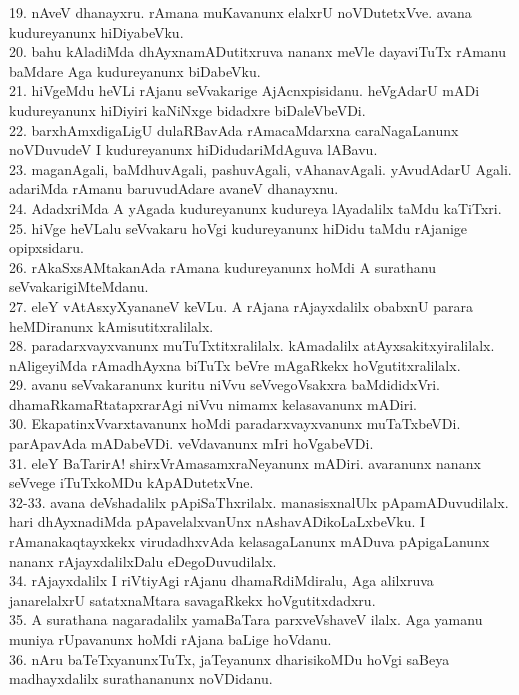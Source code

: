 \documentclass{article}
\begin{document}
19. nAveV dhanayxru. rAmana muKavanunx elalxrU noVDutetxVve. avana kudureyanunx hiDiyabeVku.\\
20. bahu kAladiMda dhAyxnamADutitxruva nananx meVle dayaviTuTx rAmanu baMdare Aga kudureyanunx biDabeVku.\\
21. hiVgeMdu heVLi rAjanu seVvakarige AjAcnxpisidanu. heVgAdarU mADi kudureyanunx hiDiyiri kaNiNxge bidadxre biDaleVbeVDi.\\
22. barxhAmxdigaLigU dulaRBavAda rAmacaMdarxna caraNagaLanunx noVDuvudeV I kudureyanunx hiDidudariMdAguva lABavu.\\
23. maganAgali, baMdhuvAgali, pashuvAgali, vAhanavAgali. yAvudAdarU Agali. adariMda rAmanu baruvudAdare avaneV dhanayxnu.\\
24. AdadxriMda A yAgada kudureyanunx kudureya lAyadalilx taMdu kaTiTxri.\\
25. hiVge heVLalu seVvakaru hoVgi kudureyanunx hiDidu taMdu rAjanige opipxsidaru.\\
26. rAkaSxsAMtakanAda rAmana kudureyanunx hoMdi A surathanu seVvakarigiMteMdanu.\\
27. eleY vAtAsxyXyananeV keVLu. A rAjana rAjayxdalilx obabxnU parara heMDiranunx kAmisutitxralilalx.\\
28. paradarxvayxvanunx muTuTxtitxralilalx. kAmadalilx atAyxsakitxyiralilalx. nAligeyiMda rAmadhAyxna biTuTx beVre mAgaRkekx hoVgutitxralilalx.\\
29. avanu seVvakaranunx kuritu niVvu seVvegoVsakxra baMdididxVri. dhamaRkamaRtatapxrarAgi niVvu nimamx kelasavanunx mADiri.\\
30. EkapatinxVvarxtavanunx hoMdi paradarxvayxvanunx muTaTxbeVDi. parApavAda mADabeVDi. veVdavanunx mIri hoVgabeVDi.\\
31. eleY BaTarirA! shirxVrAmasamxraNeyanunx mADiri. avaranunx nananx seVvege iTuTxkoMDu kApADutetxVne.\\
32-33. avana deVshadalilx pApiSaThxrilalx. manasisxnalUlx pApamADuvudilalx. hari dhAyxnadiMda pApavelalxvanUnx nAshavADikoLaLxbeVku. I rAmanakaqtayxkekx virudadhxvAda kelasagaLanunx mADuva pApigaLanunx nananx rAjayxdalilxDalu eDegoDuvudilalx.\\
34. rAjayxdalilx I riVtiyAgi rAjanu dhamaRdiMdiralu, Aga alilxruva janarelalxrU satatxnaMtara savagaRkekx hoVgutitxdadxru.\\
35. A surathana nagaradalilx yamaBaTara parxveVshaveV ilalx. Aga yamanu muniya rUpavanunx hoMdi rAjana baLige hoVdanu.\\
36. nAru baTeTxyanunxTuTx, jaTeyanunx dharisikoMDu hoVgi saBeya madhayxdalilx surathananunx noVDidanu.\\
\end{document}
